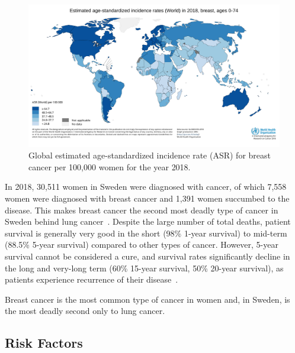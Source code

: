 \documentclass[11pt]{book}
\begin{document}
\begin{figure}[t]
\centering
\includegraphics[width=\textwidth, trim={0 35mm 15mm 15mm}, clip]{img/who_incidence_2018.pdf}
\caption[Global Breast Cancer Incidence]{Global estimated age-standardized incidence rate (ASR) for breast cancer per 100,000 women for the year 2018.}
\label{fig:incidence}
\end{figure}

In 2018, 30,511 women in Sweden were diagnosed with cancer, of which 7,558 women were diagnosed with breast cancer and 1,391 women succumbed to the disease. This makes breast cancer the second most deadly type of cancer in Sweden behind lung cancer~\cite{socialstyrelsen-2018}. Despite the large number of total deaths, patient survival is generally very good in the short (98\% 1-year survival) to mid-term (88.5\% 5-year survival) compared to other types of cancer. However, 5-year survival cannot be considered a cure, and survival rates significantly decline in the long and very-long term (60\% 15-year survival, 50\% 20-year survival), as patients experience recurrence of their disease~\cite{Brenner:2002, Pan:2017}.

Breast cancer is the most common type of cancer in women and, in Sweden, is the most deadly second only to lung cancer. 


%
%
\subsection{Risk Factors}
\label{subsec:riskfactors}
\end{document}
